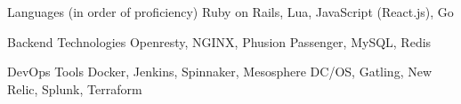 

\begin{cvskills}

  \cvskill
    {Languages (in order of proficiency)} %
    {Ruby on Rails, Lua, JavaScript (React.js), Go} %


  \cvskill
    {Backend Technologies} %
    {Openresty, NGINX, Phusion Passenger, MySQL, Redis} %

  \cvskill
    {DevOps Tools} %
    {Docker, Jenkins, Spinnaker, Mesosphere DC/OS, Gatling, New Relic, Splunk, Terraform} %

\end{cvskills}
